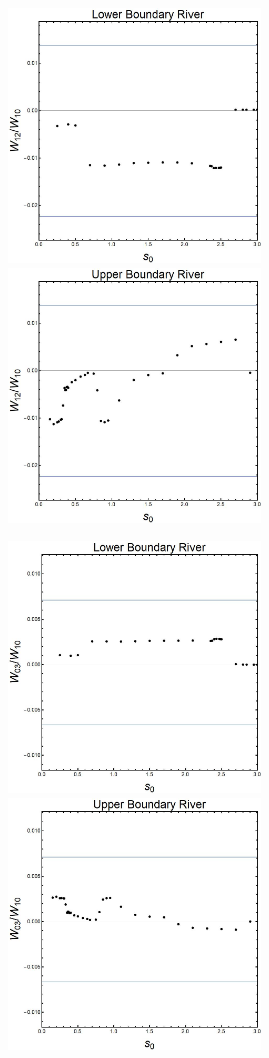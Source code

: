 ﻿\documentclass[12pt,a4paper]{article}
\begin{document}
\begin{figure}[H]
    \centering
   {{\includegraphics[width=6.7cm]{L12.jpg} }}
  {{\includegraphics[width=6.7cm]{U12.jpg} }}
\end{figure}

\begin{figure}[H]
    \centering
   {{\includegraphics[width=6.7cm]{L03.jpg} }}
  {{\includegraphics[width=6.7cm]{U03.jpg} }}
\end{figure}
\end{document}
